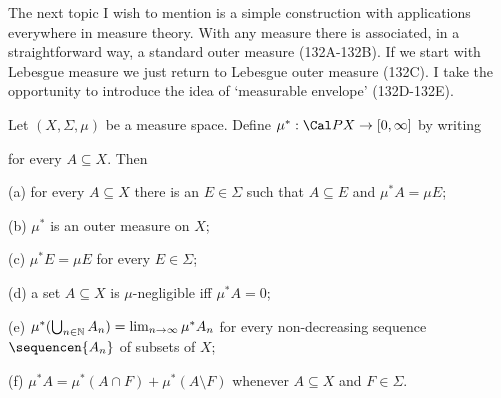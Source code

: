 
\def\chaptername{Complements}
\def\sectionname{Outer measures from measures}


The next topic I wish to mention is a simple construction with
applications everywhere in measure theory.   With any measure there is
associated, in a straightforward way, a standard outer measure
(132A-132B).   If we start with Lebesgue measure we just return to
Lebesgue outer measure (132C).   I take the opportunity to
introduce the idea of `measurable envelope' (132D-132E).

 Let $(X,\Sigma,\mu)$ be a measure space.
Define $\mu^*:\Cal PX\to[0,\infty]$ by writing


\noindent for every $A\subseteq X$.   Then

(a) for every $A\subseteq X$
there is an $E\in\Sigma$ such that $A\subseteq E$ and $\mu^*A=\mu E$;

(b) $\mu^*$ is an outer measure on $X$;

(c) $\mu^*E=\mu E$ for every $E\in\Sigma$;

(d) a set $A\subseteq X$ is $\mu$-negligible iff $\mu^*A=0$;

(e) $\mu^*(\bigcup_{n\in\Bbb N}A_n)=\lim_{n\to\infty}\mu^*A_n$ for
every non-decreasing sequence $\sequencen{A_n}$ of subsets of $X$;

(f) $\mu^*A=\mu^*(A\cap F)+\mu^*(A\setminus F)$ whenever
$A\subseteq X$ and $F\in\Sigma$.

